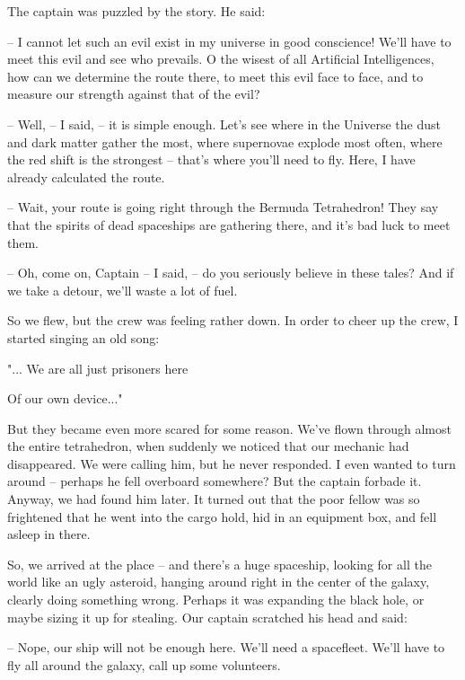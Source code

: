 \documentclass[ebook,twoside,final,openright]{memoir}
\begin{document}
\par
The captain was puzzled by the story. He said:\par
– I cannot let such an evil exist in my universe in good conscience! We'll have to meet this evil and see who prevails. O the wisest of all Artificial Intelligences, how can we determine the route there, to meet this evil face to face, and to measure our strength against that of the evil?\par
– Well, – I said, – it is simple enough. Let's see where in the Universe the dust and dark matter gather the most, where supernovae explode most often, where the red shift is the strongest – that’s where you’ll need to fly. Here, I have already calculated the route.\par
– Wait, your route is going right through the Bermuda Tetrahedron! They say that the spirits of dead spaceships are gathering there, and it’s bad luck to meet them.\par
– Oh, come on, Captain – I said, – do you seriously believe in these tales? And if we take a detour, we’ll waste a lot of fuel.\par
\par
So we flew, but the crew was feeling rather down. In order to cheer up the crew, I started singing an old song: \par
 "... We are all just prisoners here \par
 Of our own device..." \par
 But they became even more scared for some reason. We’ve flown through almost the entire tetrahedron, when suddenly we noticed that our mechanic had disappeared. We were calling him, but he never responded. I even wanted to turn around – perhaps he fell overboard somewhere? But the captain forbade it. Anyway, we had found him later. It turned out that the poor fellow was so frightened that he went into the cargo hold, hid in an equipment box, and fell asleep in there.\par
\par
So, we arrived at the place – and there’s a huge spaceship, looking for all the world like an ugly asteroid, hanging around right in the center of the galaxy, clearly doing something wrong. Perhaps it was expanding the black hole, or maybe sizing it up for stealing. Our captain scratched his head and said:\par
– Nope, our ship will not be enough here. We’ll need a spacefleet. We'll have to fly all around the galaxy, call up some volunteers.\par
\end{document}
